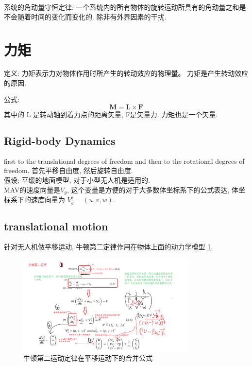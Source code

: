 \documentclass[UTF8,a4paper,10pt,nocolorlinks]{ctexart}
\begin{document}
\par 系统的角动量守恒定律: 
一个系统内的所有物体的旋转运动所具有的角动量之和是不会随着时间的变化而变化的. 除非有外界因素的干扰. 
\section{力矩}
定义: 力矩表示力对物体作用时所产生的转动效应的物理量。 力矩是产生转动效应的原因. 
\par 公式: 
\begin{equation}
  \textbf{M} = \textbf{L} \times \textbf{F}
\end{equation}
其中的 L 是转动轴到着力点的距离矢量, F是矢量力. 力矩也是一个矢量. 


\subsection{Rigid-body Dynamics}
first to the translational degrees of freedom and then to the rotational degrees of freedom.
首先平移自由度, 然后旋转自由度.\\
假设: 平缓的地面模型, 对于小型无人机是适用的. \\
MAV的速度向量是$V_{g}$, 这个变量是方便的对于大多数体坐标系下的公式表达, 体坐标系下的速度向量为 $V_{g}^{b} = (u, v, w)$. 

\clearpage
\subsection{translational motion}
针对无人机做平移运动, 牛顿第二定律作用在物体上面的动力学模型 \ref{equ_3}. 
\begin{figure}[htpb]
  \centering
  \includegraphics[width=0.8\textwidth]{picture/equ_3.png}
  \caption{牛顿第二运动定律在平移运动下的合并公式}
  \label{equ_3}
\end{figure}
\clearpage
\newpage
\end{document}
